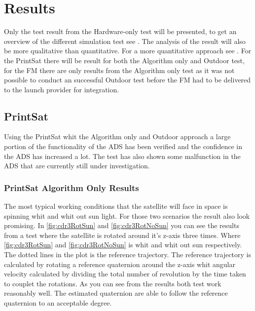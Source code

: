 \chapter{Results}\label{chap:results}
Only the test result from the Hardware-only test will be presented, to get an overview of the different simulation test see \cite{DavidThesis}. The analysis of the result will also be more qualitative than quantitative. For a more quantitative approach see \cite{DavidThesis}. For the PrintSat there will be result for both the Algorithm only and Outdoor test, for the FM there are only results from the Algorithm only test as it was not possible to conduct an successful Outdoor test before the FM had to be delivered to the launch provider for integration. 

\section{PrintSat}
Using the PrintSat whit the Algorithm only and Outdoor approach a large portion of the functionality of the ADS has been verified and the confidence in the ADS has increased a lot. The test has also shown some malfunction in the ADS that are currently still under investigation. 

\subsection{PrintSat Algorithm Only Results}
The most typical working conditions that the satellite will face in space is spinning whit and whit out sun light. For those two scenarios the result also look promising. In \autoref{fig:cdr3RotSun} and \autoref{fig:cdr3RotNoSun} you can see the results from a test where the satellite is rotated around it's z-axis three times. Where \autoref{fig:cdr3RotSun} and \autoref{fig:cdr3RotNoSun} is whit and whit out sun respectively. The dotted lines in the plot is the reference trajectory. The reference trajectory is calculated by rotating a reference quaternion around the z-axis whit angular velocity calculated by dividing the total number of revolution by the time taken to couplet the rotations. As you can see from the results both test work reasonably well. The estimated quaternion are able to follow the reference quaternion to an acceptable degree. 

